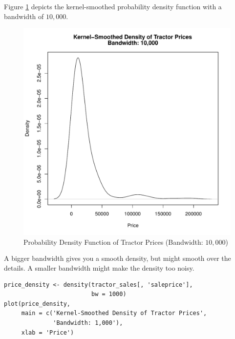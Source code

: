 \documentclass[11pt]{book}
\begin{document}
Figure \ref{fig:density_saleprice_bw10000} depicts
the kernel-smoothed probability density function
with a bandwidth of $10,000$.


\begin{figure}[h!]
  \centering
  \includegraphics[scale = 0.5, keepaspectratio=true]{../Figures/density_saleprice_bw10000}
  \caption{Probability Density Function of Tractor Prices (Bandwidth: $10,000$)} \label{fig:density_saleprice_bw10000}
\end{figure}

\pagebreak
A bigger bandwidth gives you a smooth density,
but might smooth over the details.
A smaller bandwidth might make the density too noisy.


\begin{verbatim}
price_density <- density(tractor_sales[, 'saleprice'],
                         bw = 1000)
plot(price_density,
     main = c('Kernel-Smoothed Density of Tractor Prices',
              'Bandwidth: 1,000'),
     xlab = 'Price')
\end{verbatim}
\end{document}
